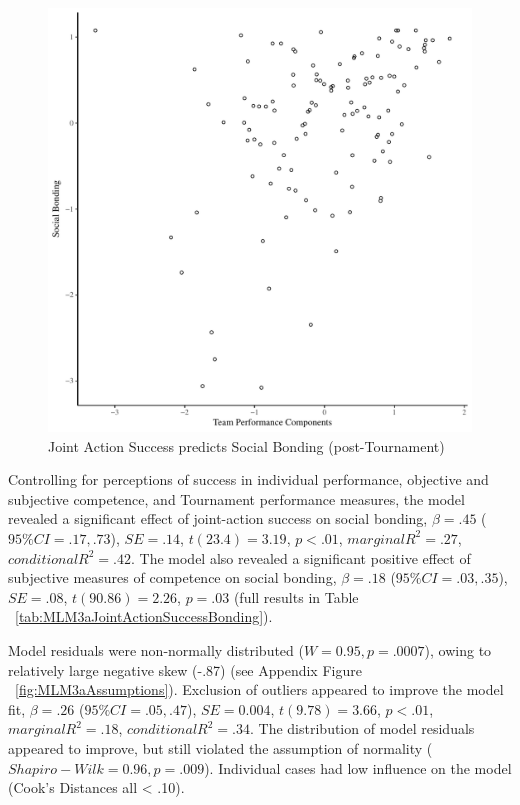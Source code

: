 \begin{figure}[htbp]
  \centering
\includegraphics[scale=.5]{images/jasBondBasicXY.pdf}
  \caption{Joint Action Success predicts Social Bonding (post-Tournament)}
  \label{fig:jasBondBasicXY}
\end{figure}

Controlling for perceptions of success in individual performance, objective and subjective competence, and Tournament performance measures, the model revealed a significant effect of joint-action success on social bonding, $\beta = .45$ ($95\% CI =  .17, .73$), $SE = .14$, $t(23.4) = 3.19$, $p < .01$, $marginal R^2 = .27$, $conditional R^2 = .42$.  The model also revealed a significant positive effect of subjective measures of competence on social bonding, $\beta = .18$ ($95\% CI =  .03, .35$), $SE = .08$, $t(90.86) = 2.26$, $p = .03$ (full results in Table ~\ref{tab:MLM3aJointActionSuccessBonding}).

Model residuals were non-normally distributed ($W = 0.95, p = .0007$), owing to relatively large negative skew (-.87) (see Appendix Figure ~\ref{fig:MLM3aAssumptions}).
Exclusion of outliers appeared to improve the model fit, $\beta = .26$ ($95\% CI =  .05, .47$), $SE = 0.004$, $t(9.78) = 3.66$, $p < .01$, $marginal R^2 = .18$, $conditional R^2 = .34$.  The distribution of model residuals appeared to improve, but still violated the assumption of normality ($Shapiro-Wilk = 0.96, p = .009$).  Individual cases had low influence on the model (Cook's Distances all < .10).

